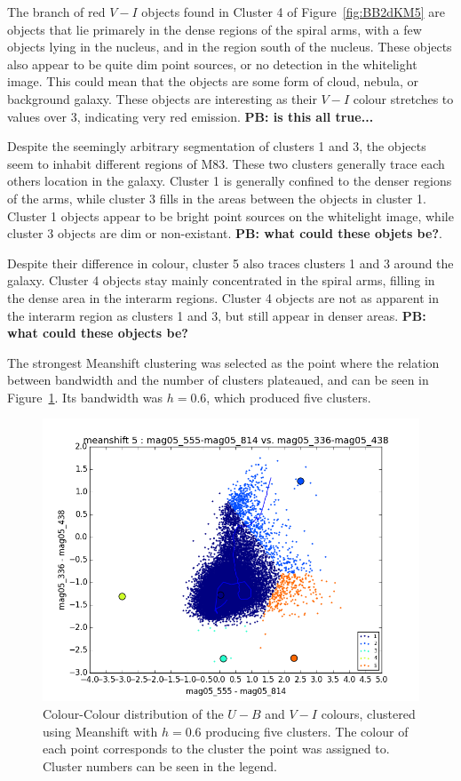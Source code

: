 The branch of red $V - I$ objects found in Cluster 4 of Figure~\ref{fig:BB2dKM5} are objects that lie primarely in the dense regions of the spiral arms, with a few objects lying in the nucleus, and in the region south of the nucleus.
These objects also appear to be quite dim point sources, or no detection in the whitelight image.
This could mean that the objects are some form of cloud, nebula, or background galaxy. 
These objects are interesting as their $V - I$ colour stretches to values over 3, indicating very red emission. \textbf{PB: is this all true...}

Despite the seemingly arbitrary segmentation of clusters 1 and 3, the objects seem to inhabit different regions of M83.
These two clusters generally trace each others location in the galaxy. 
Cluster 1 is generally confined to the denser regions of the arms, while cluster 3 fills in the areas between the objects in cluster 1.
Cluster 1 objects appear to be bright point sources on the whitelight image, while cluster 3 objects are dim or non-existant.
\textbf{PB: what could these objets be?}.

Despite their difference in colour, cluster 5 also traces clusters 1 and 3 around the galaxy.
Cluster 4 objects stay mainly concentrated in the spiral arms, filling in the dense area in the interarm regions.
Cluster 4 objects are not as apparent in the interarm region as clusters 1 and 3, but still appear in denser areas. \textbf{PB: what could these objects be?}

The strongest Meanshift clustering was selected as the point where the relation between bandwidth and the number of clusters plateaued, and can be seen in Figure~\ref{fig:BB2dMS5}.
Its bandwidth was $h=0.6$, which produced five clusters.

\begin{figure}[H]
\centering
\includegraphics[width=\linewidth]{figs/broad/meanshift_color_5cl_mag05_555-mag05_814vsmag05_336-mag05_438}
\caption{Colour-Colour distribution of the $U - B$ and $V - I$ colours, clustered using Meanshift with $h=0.6$ producing five clusters. The colour of each point corresponds to the cluster the point was assigned to. Cluster numbers can be seen in the legend.}
\label{fig:BB2dMS5}
\end{figure}

